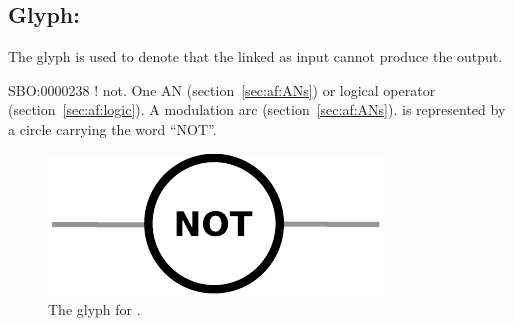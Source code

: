 \subsection{Glyph: }
\label{sec:af:not}

The glyph  is used to denote that the  linked as input cannot produce the output.

\begin{glyphDescription}
 \glyphSboTerm SBO:0000238 ! not.
 \glyphOrigin One AN (section~\ref{sec:af:ANs}) or logical operator (section~\ref{sec:af:logic}).
 \glyphTarget A modulation arc (section~\ref{sec:af:ANs}).
 \glyphNode {} is represented by a circle carrying the word ``NOT''.
 \end{glyphDescription}

\begin{figure}[H]
  \centering
  \includegraphics[scale = 0.5]{images/not}
  \caption{The \AF glyph for .}
  \label{fig:af:not}
\end{figure}
